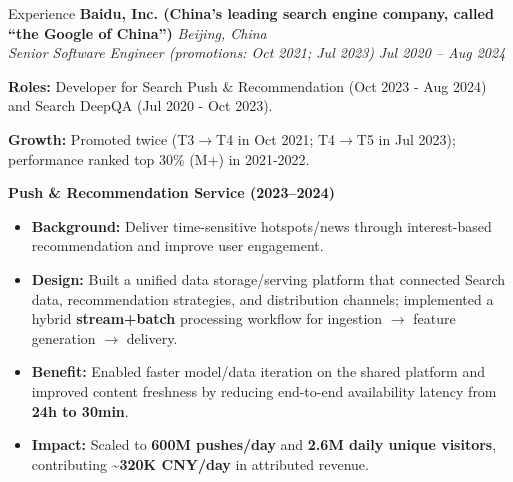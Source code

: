 \documentclass[]{resume}
\newcommand{\sectionvspace}{\vspace{1.5pt}}
\begin{document}
\begin{rSection}{Experience}\sectionvspace
\textbf{Baidu, Inc. (China’s leading search engine company, called “the Google of China”)} \hfill \textit{Beijing, China}\\
\textit{Senior Software Engineer (promotions: Oct 2021; Jul 2023)} \hfill \textit{Jul 2020 -- Aug 2024}
\item \textbf{Roles:} Developer for Search Push \& Recommendation (Oct 2023 - Aug 2024) and Search DeepQA (Jul 2020 - Oct 2023).
\item \textbf{Growth:} Promoted twice (T3$\rightarrow$T4 in Oct 2021; T4$\rightarrow$T5 in Jul 2023); performance ranked top 30\% (M+) in 2021-2022.

\vspace{1.0ex}
\item \textbf{Push \& Recommendation Service (2023--2024)}
\begin{itemize}
  \item \textbf{Background:} Deliver time-sensitive hotspots/news through interest-based recommendation and improve user engagement.
  \item \textbf{Design:} Built a unified data storage/serving platform that connected Search data, recommendation strategies, and distribution channels; implemented a hybrid \textbf{stream+batch} processing workflow for ingestion $\rightarrow$ feature generation $\rightarrow$ delivery.
  \item \textbf{Benefit:} Enabled faster model/data iteration on the shared platform and improved content freshness by reducing end-to-end availability latency from \textbf{24h to 30min}.
  \item \textbf{Impact:} Scaled to \textbf{600M pushes/day} and \textbf{2.6M daily unique visitors}, contributing \textbf{\textasciitilde320K CNY/day} in attributed revenue.
\end{itemize}


\end{rSection}
\end{document}
